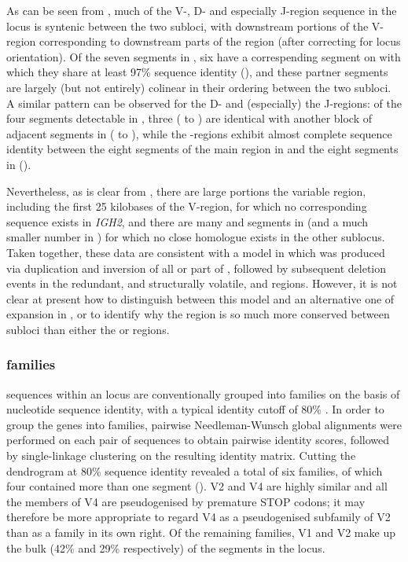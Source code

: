 As can be seen from , much of the V-, D- and especially J-region sequence in the \Nfu locus is syntenic between the two \igh{} subloci, with downstream portions of the  V-region corresponding to downstream parts of the  region (after correcting for locus orientation). Of the seven \vh segments in , six have a correspending segment on  with which they share at least 97\% sequence identity (), and these partner segments are largely (but not entirely) colinear in their ordering between the two subloci. A similar pattern can be observed for the D- and (especially) the J-regions: of the four \dh segments detectable in , three ( to ) are identical with another block of adjacent \dh segments in  ( to ), while the \jh-regions exhibit almost complete sequence identity between the eight \jh segments of the main \jh region in  and the eight \jh segments in  ().
		
Nevertheless, as is clear from , there are large portions the  variable region, including the first 25 kilobases of the V-region, for which no corresponding sequence exists in \textit{IGH2}, and there are many \vh and \dh segments in  (and a much smaller number in ) for which no close homologue exists in the other sublocus. Taken together, these data are consistent with a model in which  was produced via duplication and inversion of all or part of , followed by subsequent deletion events in the redundant, and structurally volatile,  \vh and \dh regions. However, it is not clear at present how to distinguish between this model and an alternative one of expansion in , or to identify why the \jh region is so much more conserved between subloci than either the \vh or \jh regions.
		
\subsubsection{\vh families}
\label{sec:nfu-locus-variable-families}
	
\vh sequences within an \igh{} locus are conventionally grouped into families on the basis of nucleotide sequence identity, with a typical identity cutoff of 80\% \parencite{magadan2015fishrepertoires}. In order to group the \Nfu \vh genes into families, pairwise Needleman-Wunsch global alignments were performed on each pair of \vh sequences to obtain pairwise identity scores, followed by single-linkage clustering on the resulting identity matrix. Cutting the dendrogram at 80\% sequence identity revealed a total of six \vh families, of which four contained more than one \vh segment (). V2 and V4 are highly similar and all the members of V4 are pseudogenised by premature STOP codons; it may therefore be more appropriate to regard V4 as a pseudogenised subfamily of V2 than as a \vh family in its own right. Of the remaining families, V1 and V2 make up the bulk (42\% and 29\% respectively) of the \vh segments in the locus. 
	

